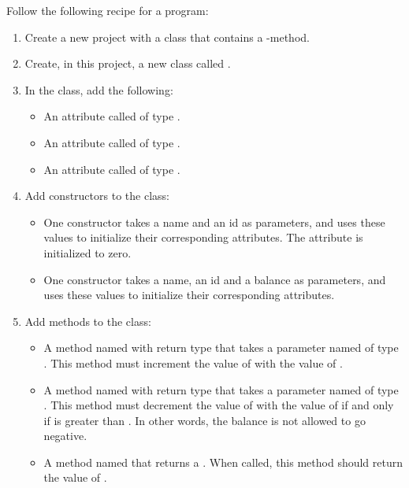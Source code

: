 Follow the following recipe for a program:
\begin{enumerate}
  \item Create a new project with a class that contains a -method.
  \item Create, in this project, a new class called .
  \item In the  class, add the following:
    \begin{itemize}
      \item An attribute called  of type .
      \item An attribute called  of type .
      \item An attribute called  of type .
    \end{itemize}
  \item Add constructors to the  class:
    \begin{itemize}
      \item One constructor takes a name and an id as parameters, and uses these values to initialize their corresponding attributes. The  attribute is initialized to zero.
      \item One constructor takes a name, an id and a balance as parameters, and uses these values to initialize their corresponding attributes.
    \end{itemize}
  \item Add methods to the  class:
    \begin{itemize}
      \item A method named  with  return type that takes a parameter named  of type . This method must increment the value of  with the value of .
      \item A method named  with  return type that takes a parameter named  of type . This method must decrement the value of  with the value of  if and only if  is greater than . In other words, the balance is not allowed to go negative.
      \item A method named  that returns a . When called, this method should return the value of .
    \end{itemize}

\end{enumerate}
